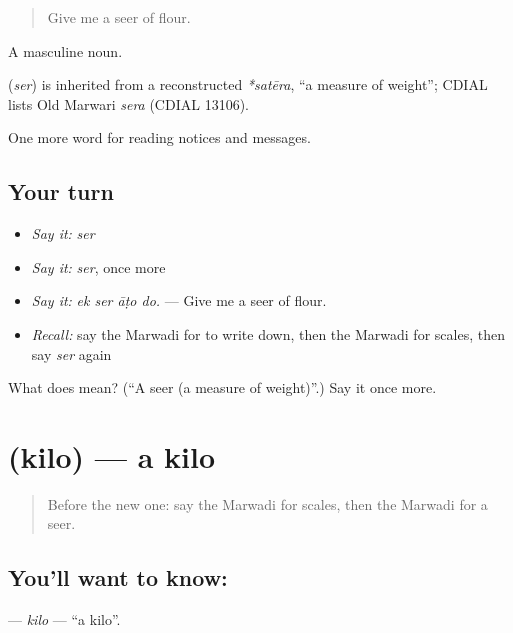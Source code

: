\begin{quote}
Give me a seer of flour.
\end{quote}

A masculine noun.

\begin{cousinweb}
\textbf{} (\emph{ser}) is inherited from a reconstructed \emph{*satēra}, \textquotedblleft{}a measure of weight\textquotedblright{}; CDIAL lists Old Marwari \emph{sera} (CDIAL 13106).
\end{cousinweb}

\begin{grammarlens}[title={What you've built}]
One more word for reading notices and messages.
\end{grammarlens}

\subsection*{Your turn}
\begin{itemize}
\raggedright
  \item \emph{Say it:} \emph{ser}
  \item \emph{Say it:} \emph{ser}, once more
  \item \emph{Say it:} \emph{ek ser āṭo do.} — Give me a seer of flour.
  \item \emph{Recall:} say the Marwadi for to write down, then the Marwadi for scales, then say \emph{ser} again
\end{itemize}

\begin{tcolorbox}[breakable,colback=teal!4,colframe=teal!35!black,title={Before you move on}]
What does  mean? (\textquotedblleft{}A seer (a measure of weight)\textquotedblright{}.) Say it once more.
\end{tcolorbox}
\section[\texorpdfstring{\mw{किलो} (kilo)}{किलो (kilo)}]{ (kilo) — a kilo}

\label{lesson:MW-C200-kilo}



\begin{quote}
Before the new one: say the Marwadi for scales, then the Marwadi for a seer.
\end{quote}

\subsection*{You'll want to know: }
\textbf{} — \emph{kilo} — \textquotedblleft{}a kilo\textquotedblright{}.

